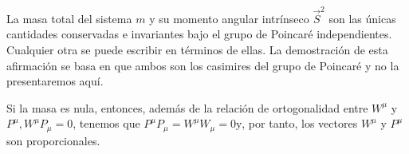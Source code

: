 \begin{corollary}
  La masa total del sistema $m$ y su momento angular intrínseco $\vec{S}^{2}$ son las únicas cantidades conservadas e invariantes bajo el grupo de Poincaré independientes. Cualquier otra se puede escribir en términos de ellas. La demostración
  de esta afirmación se basa en que ambos son los casimires del grupo de Poincaré y no la presentaremos aquí.
  
  Si la masa es nula, entonces, además de la relación de ortogonalidad entre $W^{\mu}$ y $P^{\mu}, W^{\mu} P_{\mu}=0$, tenemos que $P^{\mu} P_{\mu}=W^{\mu} W_{\mu}=0 \mathrm{y}$, por tanto, los vectores $W^{\mu}$ y $P^{\mu}$ son proporcionales.
\end{corollary}


